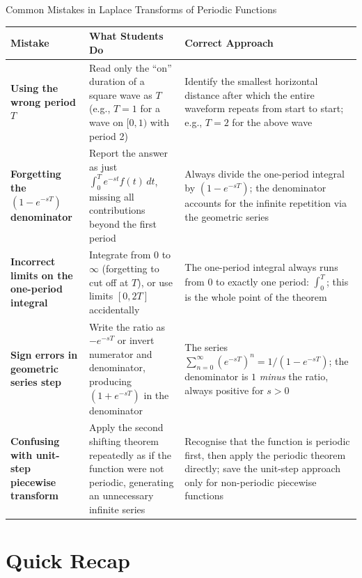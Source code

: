 \documentclass[12pt,a4paper]{article}
\begin{document}
\begin{mistakebox}{Common Mistakes in Laplace Transforms of Periodic Functions}
\begin{tabular}{@{}>{\bfseries}p{4cm}p{5cm}p{5cm}@{}}
\toprule
\textbf{Mistake} & \textbf{What Students Do} & \textbf{Correct Approach} \\
\midrule
Using the wrong period $T$ &
Read only the ``on'' duration of a square wave as $T$ (e.g., $T=1$ for a wave
on $[0,1)$ with period 2) &
Identify the smallest horizontal distance after which the entire waveform
repeats from start to start; e.g., $T=2$ for the above wave \\
\addlinespace
Forgetting the $(1-e^{-sT})$ denominator &
Report the answer as just $\int_0^T e^{-st}f(t)\,dt$, missing all
contributions beyond the first period &
Always divide the one-period integral by $(1-e^{-sT})$; the denominator
accounts for the infinite repetition via the geometric series \\
\addlinespace
Incorrect limits on the one-period integral &
Integrate from 0 to $\infty$ (forgetting to cut off at $T$), or use limits
$[0, 2T]$ accidentally &
The one-period integral always runs from 0 to exactly one period: $\int_0^T$;
this is the whole point of the theorem \\
\addlinespace
Sign errors in geometric series step &
Write the ratio as $-e^{-sT}$ or invert numerator and denominator, producing
$(1 + e^{-sT})$ in the denominator &
The series $\sum_{n=0}^{\infty}(e^{-sT})^n = 1/(1-e^{-sT})$; the denominator
is $1$ \emph{minus} the ratio, always positive for $s>0$ \\
\addlinespace
Confusing with unit-step piecewise transform &
Apply the second shifting theorem repeatedly as if the function were not
periodic, generating an unnecessary infinite series &
Recognise that the function is periodic first, then apply the periodic theorem
directly; save the unit-step approach only for non-periodic piecewise functions \\
\bottomrule
\end{tabular}
\end{mistakebox}

\section{Quick Recap}
\end{document}
